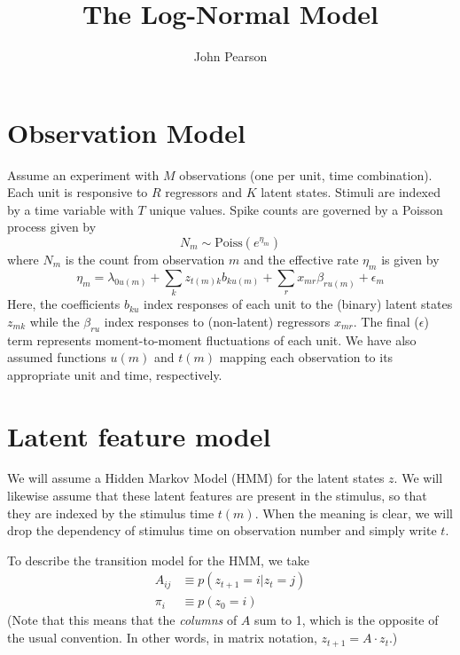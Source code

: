 \documentclass[11pt]{article}
\begin{document}
\title{The Log-Normal Model}
\author{John Pearson}
\maketitle

\section{Observation Model}
Assume an experiment with $M$ observations (one per unit, time combination). Each unit is responsive to $R$ regressors and $K$ latent states. Stimuli are indexed by a time variable with $T$ unique values. Spike counts are governed by a Poisson process given by
\begin{equation}
    N_{m} \sim \mathrm{Poiss}(e^{\eta_{m}}) 
\end{equation}
where $N_{m}$ is the count from observation $m$ and the effective rate $\eta_{m}$ is given by 
\begin{equation}
    \label{loglambda}
    \eta_m = \lambda_{0u(m)} + \sum_k z_{t(m)k} b_{ku(m)} + \sum_r x_{mr} \beta_{ru(m)} + \epsilon_{m}
\end{equation}
Here, the coefficients $b_{ku}$ index responses of each unit to the (binary) latent states $z_{mk}$ while the $\beta_{ru}$ index responses to (non-latent) regressors $x_{mr}$. The final ($\epsilon$) term represents moment-to-moment fluctuations of each unit. We have also assumed functions $u(m)$ and $t(m)$ mapping each observation to its appropriate unit and time, respectively.

\section{Latent feature model}
We will assume a Hidden Markov Model (HMM) for the latent states $z$. We will likewise assume that these latent features are present in the stimulus, so that they are indexed by the stimulus time $t(m)$. When the meaning is clear, we will drop the dependency of stimulus time on observation number and simply write $t$.

To describe the transition model for the HMM, we take
\begin{align}
    A_{ij} &\equiv p(z_{t+1} = i|z_t = j) \\
    \pi_i &\equiv p(z_0 = i)
\end{align}
(Note that this means that the \emph{columns} of $A$ sum to 1, which is the opposite of the usual convention. In other words, in matrix notation, $z_{t+1} = A \cdot z_t$.)
\end{document}
